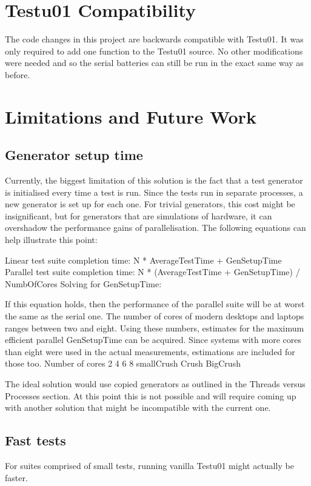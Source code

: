 \section{Testu01 Compatibility}
The code changes in this project are backwards compatible with Testu01. It was only required to add one function to the Testu01 source. No other modifications were needed and so the serial batteries can still be run in the exact same way as before.


\section{Limitations and Future Work}

\subsection{Generator setup time}
Currently, the biggest limitation of this solution is the fact that a test generator is initialised every time a test is run. Since the tests run in separate processes, a new generator is set up for each one.
For trivial generators, this cost might be insignificant, but for generators that are simulations of hardware, it can overshadow the performance gains of parallelisation. The following equations can help illustrate this point:

Linear test suite completion time: N * AverageTestTime + GenSetupTime
Parallel test suite completion time: N * (AverageTestTime + GenSetupTime) / NumbOfCores
Solving for GenSetupTime:

If this equation holds, then the performance of the parallel suite will be at worst the same as the serial one.
The number of cores of modern desktops and laptops ranges between two and eight. Using these numbers, estimates for the maximum efficient parallel GenSetupTime can be acquired. Since systems with more cores than eight were used in the actual measurements, estimations are included for those too.
Number of cores
2 4 6 8
smallCrush
Crush
BigCrush

The ideal solution would use copied generators as outlined in the Threads versus Processes section. At this point this is not possible and will require coming up with another solution that might be incompatible with the current one.

\subsection{Fast tests}
For suites comprised of small tests, running vanilla Testu01 might actually be faster.

